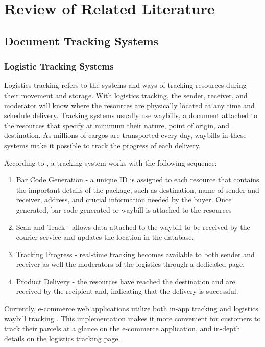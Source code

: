 \chapter{Review of Related Literature}
\label{sec:relatedlit}

\section{Document Tracking Systems}

\subsection{Logistic Tracking Systems}
Logistics tracking refers to the systems and ways of tracking resources during their movement and storage. With logistics tracking, the sender, receiver, and moderator will know where the resources are physically located at any time and schedule delivery. Tracking systems usually use waybills, a document attached to the resources that specify at minimum their nature, point of origin, and destination.\cite{waybill} As millions of cargos are transported every day, waybills in these systems make it possible to track the progress of each delivery. 

According to , a tracking system works with the following sequence:
\begin{enumerate}
    \setlength\itemsep{1em}
    \item Bar Code Generation - a unique ID is assigned to each resource that contains the important details of the package, such as destination, name of sender and receiver, address, and crucial information needed by the buyer. Once generated, bar code generated or waybill is attached to the resources
    \item Scan and Track - allows data attached to the waybill to be received by the courier service and updates the location in the database.
    \item Tracking Progress - real-time tracking becomes available to both sender and receiver as well the moderators of the logistics through a dedicated page.
    \item Product Delivery - the resources have reached the destination and are received by the recipient and, indicating that the delivery is successful.
\end{enumerate}

Currently, e-commerce web applications utilize both in-app tracking and logistics waybill tracking \cite{studio_brand, amadora_2021}. This implementation makes it more convenient for customers to track their parcels at a glance on the e-commerce application, and in-depth details on the logistics tracking page. 

